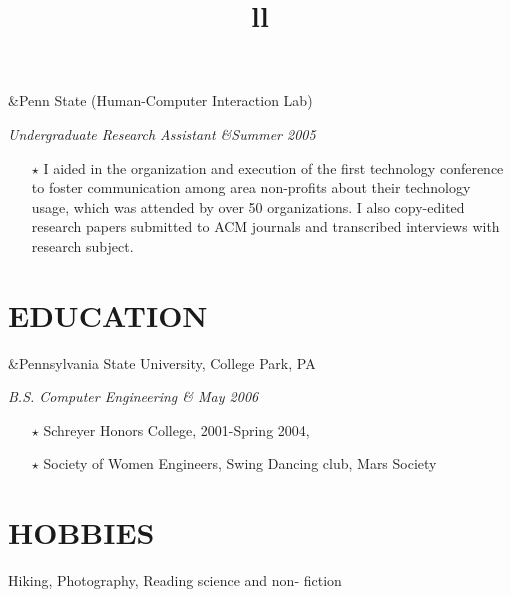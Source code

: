 \documentclass[11pt]{res} %
\begin{document}
\begin{resume}
\begin{ncolumn}{2}
	&\hfill{}Penn State (Human-Computer Interaction Lab)\\
\end{ncolumn}{}
\begin{ncolumn}{2}
	\title{l}\itshape Undergraduate Research Assistant &\hfill{}Summer 2005 \\
\end{ncolumn}
\begin{itemize} \itemsep -2pt
	\item[$\star$]I aided in the organization and execution of the first technology conference to foster communication among area non-profits about their technology usage, which was attended by over 50 organizations. I also copy-edited research papers submitted to ACM journals and transcribed interviews with research subject.
\end{itemize}

\section{EDUCATION}
 \begin{ncolumn}{2}
	&\hfill{}Pennsylvania State University, College Park, PA\\
\end{ncolumn}{}
 \begin{ncolumn}{2}
	\title{l}\itshape B.S. Computer Engineering &\hfill{} May 2006 \\
\end{ncolumn}
\begin{itemize} \itemsep -2pt
	\item[$\star$] Schreyer Honors College, 2001-Spring 2004,
	\item[$\star$] Society of Women Engineers, Swing Dancing club, Mars Society
\end{itemize}
 
\section{HOBBIES} 
Hiking, Photography, Reading science and non- fiction

\end{resume}
\end{document}
